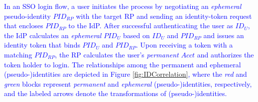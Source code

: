 \textcolor{blue}{In an SSO login flow,
a user initiates the process by negotiating an \emph{ephemeral} pseudo-identity $PID_{RP}$  with the target RP and sending an identity-token request that encloses $PID_{RP}$ to the IdP.
After successful authenticating the user as $ID_U$, the IdP calculates an \emph{ephemeral} $PID_U$ based on $ID_U$ and $PID_{RP}$ and issues an identity token that binds $PID_U$ and $PID_{RP}$. Upon receiving a token with a matching $PID_{RP}$, the RP calculates the user's \emph{permanent} $Acct$ and authorizes the token holder to login.
%
The relationships among the permanent and ephemeral (pseudo-)identities are depicted in Figure \ref{fig:IDCorrelation}, where the \emph{red} and \emph{green} blocks represent \emph{permanent} and \emph{ephemeral} (pseudo-)identities, respectively, and
the labeled arrows denote the transformations of (pseudo-)identities.}


